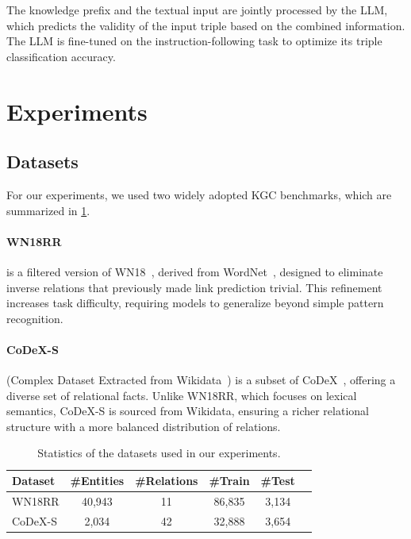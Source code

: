 \documentclass[12pt,a4paper]{article}
\begin{document}
The knowledge prefix and the textual input are jointly processed by the LLM,
which predicts the validity of the input triple based on the combined information.
The LLM is fine-tuned on the instruction-following task to optimize its triple classification accuracy.
%
%


\section{Experiments}\label{sec:experiments}

\subsection{Datasets}

For our experiments, we used two widely adopted KGC benchmarks, which are summarized in \cref{tab:datasets}.

\paragraph{WN18RR} is a filtered version of WN18~\cite{wn18rr}, derived from WordNet~\cite{wordnet}, designed to eliminate inverse relations that previously made link prediction trivial.
This refinement increases task difficulty, requiring models to generalize beyond simple pattern recognition.

\paragraph{CoDeX-S} (Complex Dataset Extracted from Wikidata~\cite{wikidata}) is a subset of CoDeX~\cite{safavi2020codex}, offering a diverse set of relational facts.
Unlike WN18RR, which focuses on lexical semantics, CoDeX-S is sourced from Wikidata, ensuring a richer relational structure with a more balanced distribution of relations.

\begin{table}
    \centering
    \begin{tabular}{l c c c c c}
        \hline
        Dataset & \#Entities & \#Relations & \#Train & \#Test \\
        \hline
        WN18RR & 40,943 & 11 & 86,835 & 3,134 \\
        CoDeX-S & 2,034 & 42 & 32,888 & 3,654 \\
        \hline
    \end{tabular}
    \caption{Statistics of the datasets used in our experiments.}
    \label{tab:datasets}
\end{table}
\end{document}
